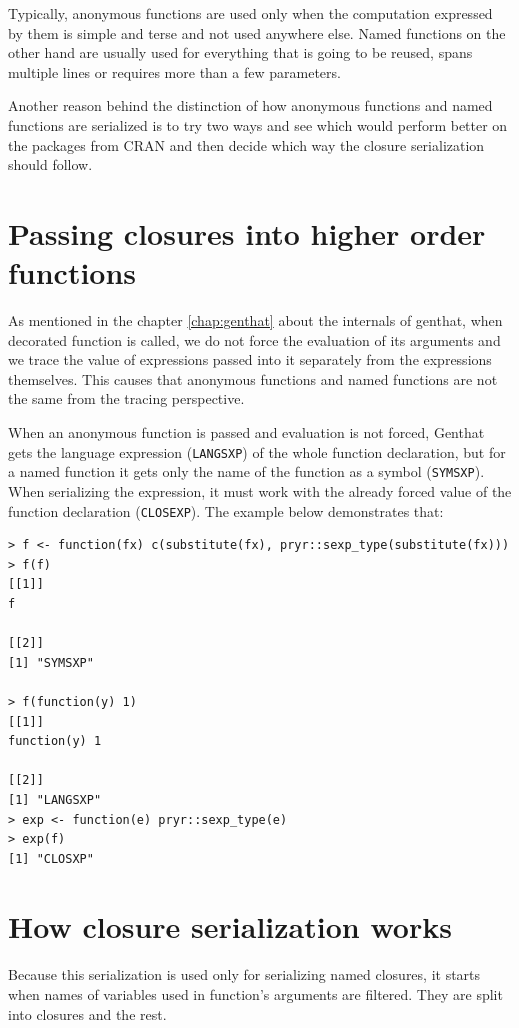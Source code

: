 \documentclass[thesis=B,english]{FITthesis}[2012/10/20]
\begin{document}
Typically, anonymous functions are used only when the computation expressed by them is simple and terse and not used anywhere else. Named functions on the other hand are usually used for everything that is going to be reused, spans multiple lines or requires more than a few parameters. 

Another reason behind the distinction of how anonymous functions and named functions are serialized is to try two ways and see which would perform better on the packages from CRAN and then decide which way the closure serialization should follow.

\section{Passing closures into higher order functions}
As mentioned in the chapter \ref{chap:genthat} about the internals of genthat, when decorated function is called, we do not force the evaluation of its arguments and we trace the value of expressions passed into it separately from the expressions themselves. This causes that anonymous functions and named functions are not the same from the tracing perspective. 

When an anonymous function is passed and evaluation is not forced, Genthat gets the language expression (\verb|LANGSXP|) of the whole function declaration, but for a named function it gets only the name of the function as a symbol (\verb|SYMSXP|). When serializing the expression, it must work with the already forced value of the function declaration (\verb|CLOSEXP|). The example below demonstrates that:

\begin{verbatim}
> f <- function(fx) c(substitute(fx), pryr::sexp_type(substitute(fx)))
> f(f)
[[1]]
f

[[2]]
[1] "SYMSXP"

> f(function(y) 1)
[[1]]
function(y) 1

[[2]]
[1] "LANGSXP"
> exp <- function(e) pryr::sexp_type(e)
> exp(f)
[1] "CLOSXP"
\end{verbatim}

\section{How closure serialization works}
Because this serialization is used only for serializing named closures, it starts when names of variables used in function’s arguments are filtered. They are split into closures and the rest.
\end{document}
